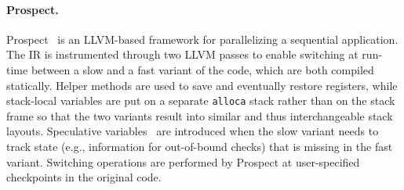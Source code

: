 
\paragraph{Prospect.} Prospect~\cite{susskraut2010prospect} is an LLVM-based framework for parallelizing a sequential application. The IR is instrumented through two LLVM passes to enable switching at run-time between a slow and a fast variant of the code, which are both compiled statically. Helper methods are used to save and eventually restore registers, while stack-local variables are put on a separate {\tt alloca} stack rather than on the stack frame so that the two variants result into similar and thus interchangeable stack layouts.
\ifdefined \fullver
Speculative variables~\cite{susskraut2009speculation} are introduced when the slow variant needs to track state (e.g., information for out-of-bound checks) that is missing in the fast variant. Switching operations are performed by Prospect at user-specified checkpoints in the original code.
\fi


